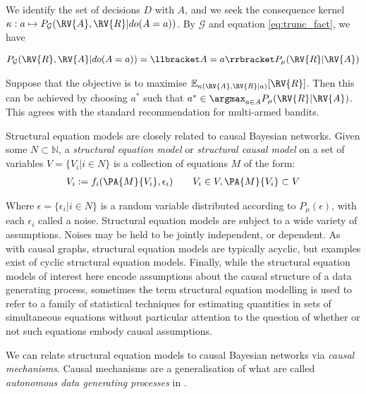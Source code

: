 We identify the set of decisions $D$ with $A$, and we seek the consequence kernel $\kappa:a\mapsto P_{\mathcal{G}}(\RV{A},\RV{R}|do(A=a))$. By $\mathcal{G}$ and equation \ref{eq:trunc_fact}, we have

\begin{align}
    P_{\mathcal{G}}(\RV{R},\RV{A}|do(A=a)) = \llbracket A=a\rrbracket P_\mu(\RV{R}|\RV{A})
\end{align}

Suppose that the objective is to maximise $\mathbb{E}_{\kappa(\RV{A},\RV{R}|a)}[\RV{R}]$. Then this can be achieved by choosing $a^*$ such that $a^*\in \argmax_{a\in A} P_\mu(\RV{R}|\RV{A})$. This agrees with the standard recommendation for multi-armed bandits\cite{barto_reinforcement_1998}.


Structural equation models are closely related to causal Bayesian networks. Given some $N\subset \mathbb{N}$, a \emph{structural equation model} or \emph{structural causal model} on a set of variables $V=\{V_i|i\in N\}$ is a collection of equations $M$ of the form:
\begin{align}
    V_i:= f_i(\PA{M}{V_i},\epsilon_i)\qquad V_i\in V, \PA{M}{V_i}\subset V
\end{align}

Where $\epsilon = \{\epsilon_i|i\in N\}$ is a random variable distributed according to $P_\mu(\epsilon)$, with each $\epsilon_i$ called a noise. Structural equation models are subject to a wide variety of assumptions. Noises may be held to be jointly independent\cite{pearl_causality:_2009,wright1921correlation,haavelmo1943statistical}, or dependent\cite{rubenstein_causal_2017,heckman_structural_2005}. As with causal graphs, structural equation models are typically acyclic, but examples exist of cyclic structural equation models\cite{bongers_theoretical_2016,itani2010structure}. Finally, while the structural equation models of interest here encode assumptions about the causal structure of a data generating process, sometimes the term structural equation modelling is used to refer to a family of statistical techniques for estimating quantities in sets of simultaneous equations without particular attention to the question of whether or not such equations embody causal assumptions\cite{chin_commentary:_1998}.

We can relate structural equation models to causal Bayesian networks via \emph{causal mechanisms}. Causal mechanisms are a generalisation of what are called \emph{autonomous data generating processes} in \cite{bareinboim_local_2012}.

